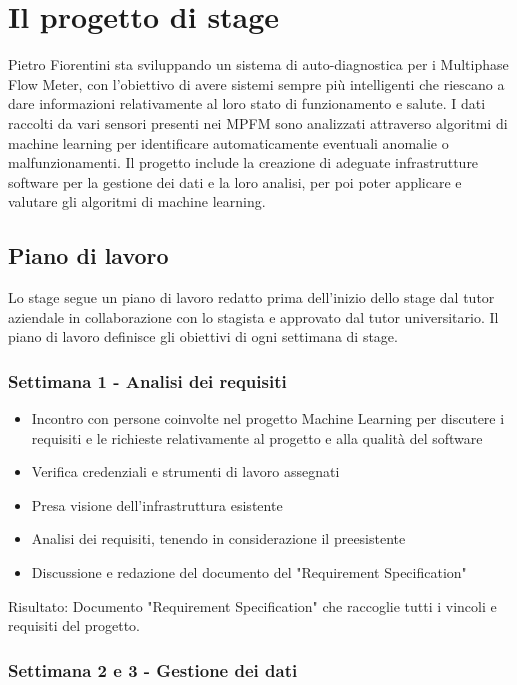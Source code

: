 
\chapter{Il progetto di stage}
Pietro Fiorentini sta sviluppando un sistema di auto-diagnostica per i Multiphase Flow Meter, con l'obiettivo di avere sistemi sempre più intelligenti che riescano a dare informazioni relativamente al loro stato di funzionamento e salute. 
I dati raccolti da vari sensori presenti nei MPFM sono analizzati attraverso algoritmi di machine learning per identificare automaticamente eventuali anomalie o malfunzionamenti.
Il progetto include la creazione di adeguate infrastrutture software per la gestione dei dati e la loro analisi, per poi poter applicare e valutare gli algoritmi di machine learning.

\section{Piano di lavoro}
Lo stage segue un piano di lavoro redatto prima dell'inizio dello stage dal tutor aziendale in collaborazione con lo stagista e approvato dal tutor universitario.
Il piano di lavoro definisce gli obiettivi di ogni settimana di stage.

\subsection{Settimana 1 - Analisi dei requisiti}

\begin{itemize}
	\item Incontro con persone coinvolte nel progetto Machine Learning per discutere i requisiti e le richieste relativamente al progetto e alla qualità del software
	\item Verifica credenziali e strumenti di lavoro assegnati
	\item Presa visione dell'infrastruttura esistente
	\item Analisi dei requisiti, tenendo in considerazione il preesistente
	\item Discussione e redazione del documento del "Requirement Specification"
\end{itemize}
Risultato: Documento "Requirement Specification" che raccoglie tutti i vincoli e requisiti del progetto.

\subsection{Settimana 2 e 3 - Gestione dei dati}

